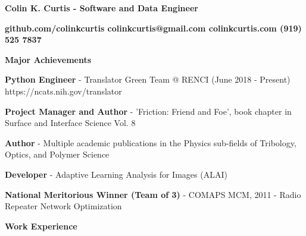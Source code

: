 \documentclass[letterpaper,final]{memoir}
\newcommand{\LargeSep}{\vspace{1.3em}}
\newcommand{\Sep}{\vspace{1.0em}}
\newcommand{\SmallSep}{\vspace{0.4em}}
\newcommand{\CVSection}[1]
	{\LARGE\textbf{#1}\par
	\SmallSep\normalsize}
\newcommand{\CVItem}[1]
	{\textbf{\color{Blue} #1}}
\newcommand\tab[1][1cm]{\hspace*{#1}}
\begin{document}
\Huge \bfseries {\color{Blue} Colin K. Curtis - Software and Data Engineer}

\SmallSep
\normalsize\normalfont

\CVItem  \tab \bfseries {github.com/colinkcurtis \tab colinkcurtis@gmail.com  \tab colinkcurtis.com \tab  (919) 525 7837} 

\Sep





\notoserif \CVSection{Major Achievements}
\normalfont

\Sep

\begin{compactitem}
    
    \item \textbf{Python Engineer} - Translator Green Team @ RENCI (June 2018 - Present) https://ncats.nih.gov/translator
    \SmallSep

    \item \textbf{Project Manager and Author} - 'Friction: Friend and Foe', book chapter in Surface and Interface Science Vol. 8
    \SmallSep

    \item \textbf{Author} - Multiple academic publications in the Physics sub-fields of Tribology, Optics, and Polymer Science
    \SmallSep

    \item \textbf{Developer} - Adaptive Learning Analysis for Images (ALAI)
    \SmallSep
    
    \item \textbf{National Meritorious Winner (Team of 3)} - COMAPS MCM, 2011 - Radio Repeater Network Optimization
	
\end{compactitem}

\LargeSep


\notoserif \CVSection{Work Experience}
\normalfont

\Sep
\end{document}
